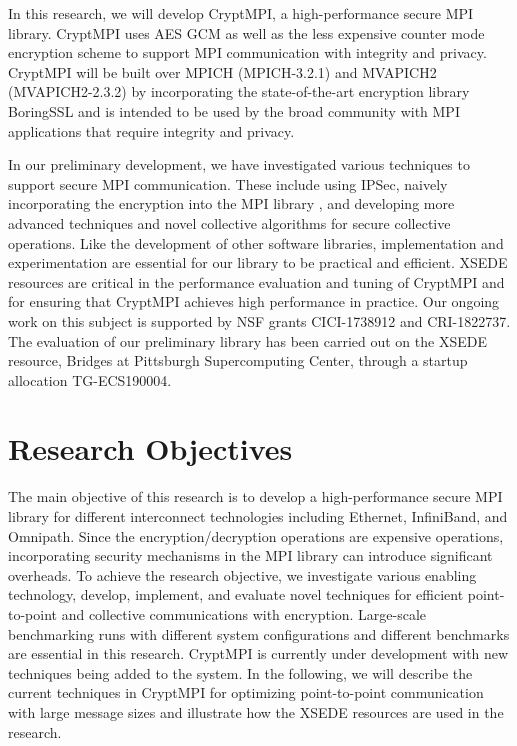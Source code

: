 In this research, we will develop CryptMPI, a high-performance secure MPI library.
CryptMPI uses AES GCM as well as the less expensive counter mode encryption scheme
to support MPI communication with integrity and privacy.
CryptMPI will be built over MPICH (MPICH-3.2.1) and MVAPICH2 (MVAPICH2-2.3.2)
by incorporating the state-of-the-art encryption library BoringSSL and is intended
to be used by the broad community with MPI applications that require integrity
and privacy.

In our preliminary development, we have investigated various techniques to support
secure MPI communication. These include using IPSec, naively incorporating the
encryption into the MPI library \cite{Cluster:Naser19}, and developing more
advanced techniques and novel collective algorithms for secure collective operations.
Like the development of other software libraries, implementation and
experimentation are essential for our library to be
practical and efficient. XSEDE resources are critical in the performance
evaluation and tuning of CryptMPI and for ensuring that CryptMPI achieves high performance
in practice. Our ongoing work on this subject is supported by NSF grants
CICI-1738912 and CRI-1822737. The evaluation of our preliminary library has been carried
out on the XSEDE resource, Bridges at Pittsburgh Supercomputing Center, through a
startup allocation TG-ECS190004. 

\section{Research Objectives}

The main objective of this research is to develop a high-performance secure MPI
library for different interconnect technologies including Ethernet, InfiniBand, and
Omnipath. Since the encryption/decryption operations are expensive operations,
incorporating security mechanisms in the MPI library can introduce significant
overheads. To achieve the research objective, we investigate various
enabling technology, develop, implement, and evaluate novel techniques for efficient
point-to-point and collective communications with encryption. Large-scale
benchmarking runs with different system configurations and different benchmarks
are essential in this research. CryptMPI is currently under development with new
techniques being added to the system. In the following, we will describe
the current techniques in CryptMPI for optimizing point-to-point communication with
large message sizes and illustrate how the XSEDE resources are used in the
research. 

